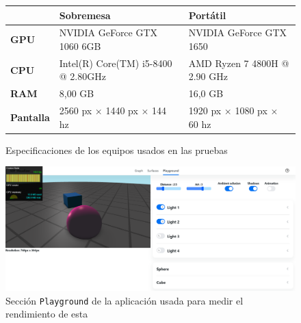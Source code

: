 \begin{figure}[ht!]
    \centering
    \begin{table}[H]
\begin{tabular}{l|l|l|}
\cline{2-3}
                                        & \textbf{Sobremesa}                      & \textbf{Portátil}                               \\ \hline
\multicolumn{1}{|l|}{\textbf{GPU}}      & NVIDIA GeForce GTX 1060 6GB             & NVIDIA GeForce GTX 1650                         \\ \hline
\multicolumn{1}{|l|}{\textbf{CPU}}      & Intel(R) Core(TM) i5-8400 @ 2.80GHz & AMD Ryzen 7 4800H @ 2.90 GHz \\ \hline
\multicolumn{1}{|l|}{\textbf{RAM}}      & 8,00 GB                                 & 16,0 GB                                         \\ \hline
\multicolumn{1}{|l|}{\textbf{Pantalla}} & 2560 px $\times$ 1440 px $\times$ 144 hz               & 1920 px  $\times$ 1080 px  $\times$ 60 hz                                  \\ \hline
\end{tabular}
\end{table}
    \caption{Especificaciones de los equipos usados en las pruebas}
    \label{fig:specs}
\end{figure}

\begin{figure}[ht!]
    \centering
    \includegraphics[width=\textwidth]{Plantilla-TFG-master/img/playground.png}
    \caption{Sección \texttt{Playground} de la aplicación usada para medir el rendimiento de esta}
\end{figure}


